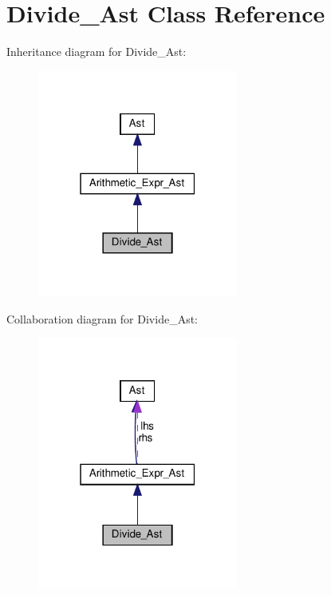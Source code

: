 \hypertarget{classDivide__Ast}{}\section{Divide\+\_\+\+Ast Class Reference}
\label{classDivide__Ast}


Inheritance diagram for Divide\+\_\+\+Ast\+:
\nopagebreak
\begin{figure}[H]
\begin{center}
\leavevmode
\includegraphics[width=187pt]{classDivide__Ast__inherit__graph}
\end{center}
\end{figure}


Collaboration diagram for Divide\+\_\+\+Ast\+:
\nopagebreak
\begin{figure}[H]
\begin{center}
\leavevmode
\includegraphics[width=187pt]{classDivide__Ast__coll__graph}
\end{center}
\end{figure}
